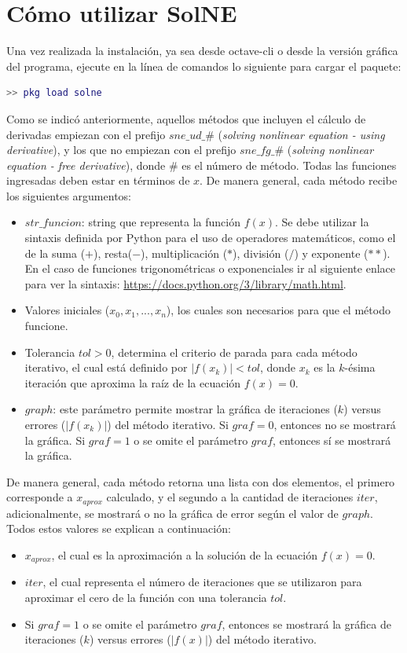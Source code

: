 \documentclass[12pt]{article}
\begin{document}
\section{Cómo utilizar SolNE}\label{uso}
Una vez realizada la instalación, ya sea desde octave-cli o desde la versión gráfica del programa, ejecute en la línea de comandos lo siguiente para cargar el paquete:
\begin{lstlisting}[language=matlab]
  >> pkg load solne
\end{lstlisting}
Como se indicó anteriormente, aquellos métodos que incluyen el cálculo de derivadas empiezan con el prefijo $sne\_ud\_\#$ (\textit{solving nonlinear equation - using derivative}), y los que no empiezan con el prefijo $sne\_fg\_\#$ (\textit{solving nonlinear equation - free derivative}), donde $\#$ es el número de método. Todas las funciones ingresadas deben estar en términos de $x$.\newline
De manera general, cada método recibe los siguientes argumentos:
\begin{itemize}
	\item $str\_funcion$: string que representa la función $f(x)$. Se debe utilizar la sintaxis definida por Python para el uso de operadores matemáticos, como el de la suma ($+$), resta($-$), multiplicación ($*$), división ($/$) y exponente ($**$). En el caso de funciones trigonométricas o exponenciales ir al siguiente enlace para ver la sintaxis: \url{https://docs.python.org/3/library/math.html}.
	\item Valores iniciales ($x_{0}, x_{1}, ..., x_{n}$), los cuales son necesarios para que el método funcione.
	\item Tolerancia $tol > 0$, determina el criterio de parada para cada método iterativo, el cual está definido por $|f(x_{k})| < tol$, donde $x_{k}$ es la $k$-ésima iteración que aproxima la raíz de la ecuación $f(x) = 0$.
	\item $graph$: este parámetro permite mostrar la gráfica de iteraciones ($k$) versus errores ($|f(x_{k})|$) del método iterativo. Si $graf = 0$, entonces no se mostrará la gráfica. Si $graf = 1$ o se omite el parámetro $graf$, entonces sí se mostrará la gráfica.
\end{itemize}
De manera general, cada método retorna una lista con dos elementos, el primero corresponde a $x_{aprox}$ calculado, y el segundo a la cantidad de iteraciones $iter$, adicionalmente, se mostrará o no la gráfica de error según el valor de $graph$. Todos estos valores se explican a continuación:
\begin{itemize}
	\item $x_{aprox}$, el cual es la aproximación a la solución de la ecuación $f(x) = 0$.
	\item $iter$, el cual representa el número de iteraciones que se utilizaron para aproximar el cero de la función con una tolerancia $tol$.
	\item Si $graf = 1$ o se omite el parámetro $graf$, entonces se mostrará la gráfica de iteraciones ($k$) versus errores ($|f(x)|$) del método iterativo.
\end{itemize}
\end{document}
